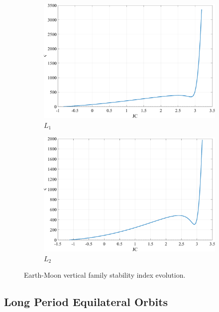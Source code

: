 \begin{figure}[ht]
    \begin{subfigure}[h]{0.4\linewidth}
        \includegraphics[width=\textwidth]{figures/L1VerticalStability.pdf}
        \caption{$L_{1}$}
    \end{subfigure}
    \hfill
    \begin{subfigure}[h]{0.4\linewidth}
        \includegraphics[width=\textwidth]{figures/L2VerticalStability.pdf}
        \caption{$L_{2}$}
    \end{subfigure}
    \caption{Earth-Moon vertical family stability index evolution.}
    \label{fig:verticalStability}
\end{figure}

\subsection{Long Period Equilateral Orbits}
